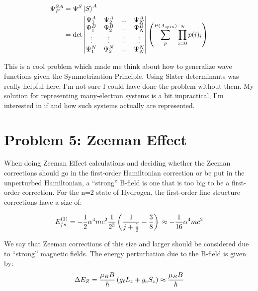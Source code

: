 \documentclass[10pt]{article} %
\begin{document}
\begin{align*}
  \Psi_F^{SA} &= \Psi^S\ket{S}^A\\
  &= \det
  \begin{vmatrix}
    \Psi^A_1 & \Psi^A_2 & ... & \Psi^A_N\\
    \Psi^B_1 & \Psi^B_2 & ... & \Psi^B_N\\
    \vdots & \vdots & \vdots & \vdots\\
    \Psi^N_1 & \Psi^N_2 & ... & \Psi^N_N\\
  \end{vmatrix}
  \left(\sum_p^{P(A_{spin})}\prod_{i=0}^N p(i)_i\right)
\end{align*}

This is a cool problem which made me think about how to generalize wave functions given the
Symmetrization Principle. Using Slater determinants was really helpful here, I'm not sure I could
have done the problem without them. My solution for representing many-electron systems is a bit
impractical, I'm interested in if and how such systems actually are represented.\\

\section{Problem 5: Zeeman Effect}
When doing Zeeman Effect calculations and deciding whether the Zeeman corrections should go in the
first-order Hamiltonian correction or be put in the unperturbed Hamiltonian, a ``strong'' B-field
is one that is too big to be a first-order correction. For the n=2 state of Hydrogen, the
first-order fine structure corrections have a size of:

\begin{equation*}
  E_{fs}^{(1)}
  = -\frac{1}{2}\alpha^4mc^2\frac{1}{2^3}\left(\frac{1}{j+\frac{1}{2}}-\frac{3}{8}\right)\\
  \approx -\frac{1}{16}\alpha^4mc^2\\
\end{equation*}

We say that Zeeman corrections of this size and larger should be considered due to ``strong''
magnetic fields. The energy perturbation due to the B-field is given by:\\

\begin{equation*}
  \Delta E_{Z} = \frac{\mu_B B}{\hbar}\left(g_\ell L_z + g_e S_z\right)
  \approx \frac{\mu_B B}{\hbar}\\
\end{equation*}
\end{document}
